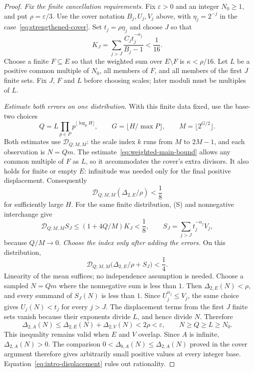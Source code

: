 \documentclass[11pt]{article}
\begin{document}
\begin{proof}
\emph{Fix the finite cancellation requirements.}
Fix $\varepsilon>0$ and an integer $N_0\ge1$, and put $\rho=\varepsilon/3$.
Use the cover notation $B_j,U_j,V_j$ above, with $\eta_j=2^{-j}$ in
the case~\eqref{eq:strengthened-cover}.  Set $t_j=\rho\eta_j$ and choose
$J$ so that
\[
 K_J=\sum_{j>J}\frac{C_jt_j^{-\alpha_j}}{B_j-1}<\frac1{16}.
\]
Choose a finite $F\subseteq E$ so that the weighted sum over $E\setminus F$ is
$\kappa<\rho/16$.  Let $L$ be a positive common multiple of $N_0$, all
members of $F$, and all members of the first $J$ finite sets. Fix
$J$, $F$ and $L$ before choosing scales; later moduli must be multiples
of $L$.

\emph{Estimate both errors on one distribution.}
With this finite data fixed, use the base-two choices
\[
 Q=L\prod_{p\in P}p^{\lfloor\log_pH\rfloor},\qquad
 G=\lfloor H/\max P\rfloor,\qquad M=\lfloor2^{G/2}\rfloor.
\]
Both estimates use $\mathscr D_{Q;M,M}$: the scale index $k$ runs
from $M$ to $2M-1$, and each observation is $N=Qm$.
The estimate~\eqref{eq:weighted-main-bound} allows any common multiple
of $F$ as $L$, so it accommodates the cover's extra divisors. It also
holds for finite or empty $E$: infinitude was needed only for the final
positive displacement. Consequently
\[
 \mathscr D_{Q;M,M}(\Delta_{2,E}/\rho)<\frac18
\]
for sufficiently large $H$.  For the same finite distribution, (S) and
nonnegative interchange give
\[
 \mathscr D_{Q;M,M}S_J\le(1+4Q/M)K_J<\frac18,
 \qquad S_J=\sum_{j>J}t_j^{-\alpha_j}V_j,
\]
because $Q/M\to0$.
\emph{Choose the index only after adding the errors.}
On this distribution,
\[
 \mathscr D_{Q;M,M}\bigl(\Delta_{2,E}/\rho+S_J\bigr)<\frac14.
\]
Linearity of the mean suffices; no independence assumption is needed.
Choose a sampled $N=Qm$ where the nonnegative sum is less than $1$.
Then $\Delta_{2,E}(N)<\rho$, and every summand of $S_J(N)$ is less
than $1$. Since $U_j^{\alpha_j}\le V_j$, the same choice gives
$U_j(N)<t_j$ for every $j>J$.
The displacement terms from the first $J$ finite sets vanish because
their exponents divide $L$, and hence divide $N$. Therefore
\[
 \Delta_{2,A}(N)\le\Delta_{2,E}(N)+\Delta_{2,V}(N)<2\rho<\varepsilon,
 \qquad N\ge Q\ge L\ge N_0.
\]
This inequality remains valid when $E$ and $V$ overlap. Since $A$ is
infinite, $\Delta_{2,A}(N)>0$. The comparison
$0<\Delta_{b,A}(N)\le\Delta_{2,A}(N)$ proved in the cover argument
therefore gives arbitrarily small positive values at every integer
base. Equation~\eqref{eq:intro-displacement} rules out rationality.
\end{proof}
\end{document}
